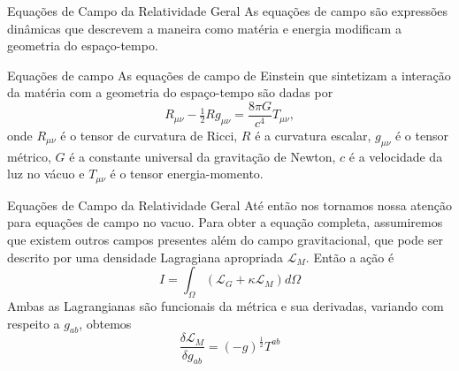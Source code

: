 \documentclass{beamer}
\theoremstyle{plain}
\theoremstyle{definition}
\theoremstyle{definition}
\theoremstyle{definition}
\theoremstyle{definition}
\theoremstyle{definition}
\theoremstyle{definition}
\theoremstyle{definition}
\theoremstyle{definition}
\begin{document}
\begin{frame}{Equações de Campo da Relatividade Geral}
    As equações de campo são expressões dinâmicas que descrevem a maneira como matéria e energia modificam a geometria do espaço-tempo.
    \begin{block}{Equações de campo}
    As equações de campo de Einstein que sintetizam a interação da matéria com a geometria do espaço-tempo são dadas por
\[R_{\mu \nu} - \tfrac{1}{2}R g_{\mu \nu} = \frac{8 \pi G }{c^4} T_{\mu \nu},\]
onde $R_{\mu \nu}$ é o tensor de curvatura de Ricci, $R$ é a curvatura escalar, $ g_{\mu \nu}$ é o tensor métrico, $G$ é a constante universal da gravitação de Newton, $c$ é a velocidade da luz no vácuo e $T_{\mu \nu}$ é o tensor energia-momento.
\end{block}

\end{frame}

\begin{frame}{Equações de Campo da Relatividade Geral}
\justifying
Até então nos tornamos nossa atenção para equações de campo no vacuo.
Para obter a equação completa, assumiremos que existem outros campos
presentes além do campo gravitacional, que pode ser descrito por
uma densidade Lagragiana apropriada $\mathcal{L}_M$. Então a ação é
$$
I = \int_\Omega (\mathcal{L}_G + \kappa\mathcal{L}_M)d\Omega
$$
Ambas as Lagrangianas são funcionais da métrica e sua derivadas,
variando com respeito a $g_{ab}$, obtemos
$$
\frac{\delta \mathcal{L}_M}{\delta g_{ab}} = (-g)^{\frac{1}{2}}T^{ab}
$$
\end{frame}
\end{document}
